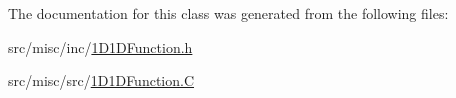 The documentation for this class was generated from the following files\-:\begin{DoxyCompactItemize}
\item 
src/misc/inc/\hyperlink{1_d1_d_function_8h}{1\-D1\-D\-Function.\-h}\item 
src/misc/src/\hyperlink{1_d1_d_function_8_c}{1\-D1\-D\-Function.\-C}\end{DoxyCompactItemize}
